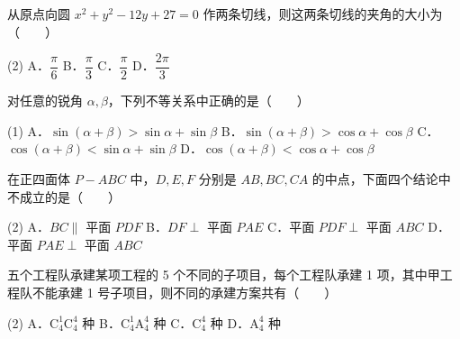 \begin{question}
从原点向圆 $x^2 + y^2 - 12y + 27 = 0$ 作两条切线，则这两条切线的夹角的大小为\mbox{（　　）}

\begin{gkopts}(2)
\task A．$\dfrac{\pi}{6}$
\task B．$\dfrac{\pi}{3}$
\task C．$\dfrac{\pi}{2}$
\task D．$\dfrac{2\pi}{3}$
\end{gkopts}

\end{question}
\begin{question}
对任意的锐角 $\alpha, \beta$，下列不等关系中正确的是\mbox{（　　）}

\begin{gkopts}(1)
\task A．$\sin(\alpha + \beta) > \sin\alpha + \sin\beta$
\task B．$\sin(\alpha + \beta) > \cos\alpha + \cos\beta$
\task C．$\cos(\alpha + \beta) < \sin\alpha + \sin\beta$
\task D．$\cos(\alpha + \beta) < \cos\alpha + \cos\beta$
\end{gkopts}

\end{question}
\begin{question}
在正四面体 $P - ABC$ 中，$D, E, F$ 分别是 $AB, BC, CA$ 的中点，下面四个结论中不成立的是\mbox{（　　）}

\begin{gkopts}(2)
\task A．$BC \parallel$ 平面 $PDF$
\task B．$DF \perp$ 平面 $PAE$
\task C．平面 $PDF \perp$ 平面 $ABC$
\task D．平面 $PAE \perp$ 平面 $ABC$
\end{gkopts}

\end{question}
\begin{question}
五个工程队承建某项工程的 5 个不同的子项目，每个工程队承建 1 项，其中甲工程队不能承建 1 号子项目，则不同的承建方案共有\mbox{（　　）}

\begin{gkopts}(2)
\task A．$\mathrm{C}_4^1 \mathrm{C}_4^4$ 种
\task B．$\mathrm{C}_4^1 \mathrm{A}_4^4$ 种
\task C．$\mathrm{C}_4^4$ 种
\task D．$\mathrm{A}_4^4$ 种
\end{gkopts}

\end{question}

